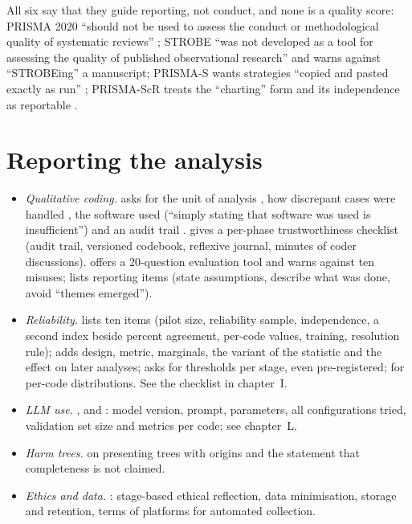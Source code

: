 All six say that they guide reporting, not conduct, and none is a quality score: PRISMA 2020 ``should not be used to assess the conduct or methodological quality of systematic reviews'' ; STROBE ``was not developed as a tool for assessing the quality of published observational research''  and warns against ``STROBEing'' a manuscript; PRISMA-S wants strategies ``copied and pasted exactly as run'' ; PRISMA-ScR treats the ``charting'' form and its independence as reportable .

\section{Reporting the analysis}
\begin{itemize}
\item \emph{Qualitative coding.}  asks for the unit of analysis , how discrepant cases were handled , the software used (``simply stating that software was used is insufficient'') and an audit trail .  gives a per-phase trustworthiness checklist (audit trail, versioned codebook, reflexive journal, minutes of coder discussions).  offers a 20-question evaluation tool and warns against ten misuses;  lists reporting items (state assumptions, describe what was done, avoid ``themes emerged'').
\item \emph{Reliability.}  lists ten items (pilot size, reliability sample, independence, a second index beside percent agreement, per-code values, training, resolution rule);  adds design, metric, marginals, the variant of the statistic and the effect on later analyses;  asks for thresholds per stage, even pre-registered;  for per-code distributions. See the checklist in chapter~I.
\item \emph{LLM use.} ,  and : model version, prompt, parameters, all configurations tried, validation set size and metrics per code; see chapter~L.
\item \emph{Harm trees.}  on presenting trees with origins and the statement that completeness is not claimed.
\item \emph{Ethics and data.} : stage-based ethical reflection, data minimisation, storage and retention, terms of platforms for automated collection.
\end{itemize}


